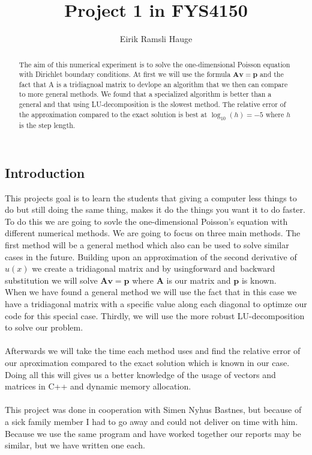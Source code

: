 \documentclass[12pt,a4paper]{article}
\author{Eirik Ramsli Hauge}
\title{Project 1 in FYS4150}
\newcommand{\V}[1]{\mathbf{#1}}
\begin{document}
	\maketitle
	
\begin{abstract}
The aim of this numerical experiment is to solve the one-dimensional Poisson equation with Dirichlet boundary conditions. At first we will use the formula $\V{A} \V{v} = \V{p}$ and the fact that A is a tridiagnoal matrix to devlope an algorithm that we then can compare to more general methods. We found that a specialized algorithm is better than a general and that using LU-decomposition is the slowest method. The relative error of the approximation compared to the exact solution is best at $\log_{10}(h) = -5$ where $h$ is the step length.
\end{abstract}
\subsection*{Introduction}
This projects goal is to learn the students that giving a computer less things to do but still doing the same thing, makes it do the things you want it to do faster.\cite{Project} To do this we are going to sovle the one-dimensional Poisson's equation with different numerical methods. We are going to focus on three main methods. 
The first method will be a general method which also can be used to solve similar cases in the future. Building upon an approximation of the second derivative of $u(x)$ we create a tridiagonal matrix and by usingforward and backward substitution we will solve $\V{A} \V{v} = \V{p}$ where $\V{A}$ is our matrix and $\V{p}$ is known. \\
When we have found a general method we will use the fact that in this case we have a tridiagonal matrix with a specific value along each diagonal to optimze our code for this special case. Thirdly, we will use the more robust LU-decomposition to solve our problem. \\ \\
Afterwards we will take the time each method uses and find the relative error of our aproximation compared to the exact solution which is known in our case. Doing all this will gives us a better knowledge of the usage of vectors and matrices in C++ and dynamic memory allocation.  \\ \\
This project was done in cooperation with Simen Nyhus Bastnes, but because of a sick family member I had to go away and could not deliver on time with him. Because we use the same program and have worked together our reports may be similar, but we have written one each.
\end{document}

